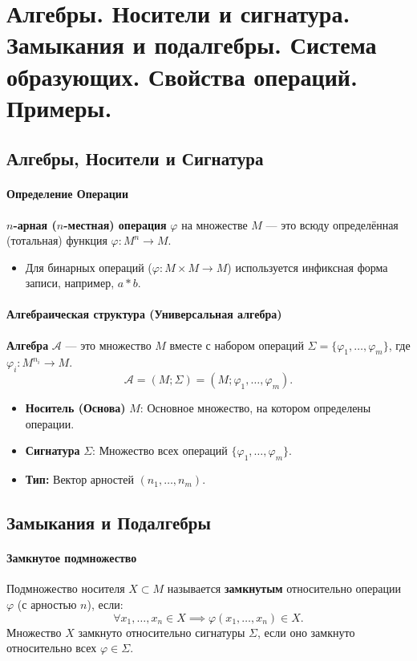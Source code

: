 \section{Алгебры. Носители и сигнатура. Замыкания и подалгебры. Система образующих. Свойства операций. Примеры.}

\subsection*{Алгебры, Носители и Сигнатура}

\paragraph{Определение Операции}
\textbf{$n$-арная ($n$-местная) операция} $\varphi$ на множестве $M$ --- это всюду определённая (тотальная) функция $\varphi: M^n \to M$.
\begin{itemize}
    \item Для бинарных операций ($\varphi: M \times M \to M$) используется инфиксная форма записи, например, $a \ast b$.
\end{itemize}

\paragraph{Алгебраическая структура (Универсальная алгебра)}
\textbf{Алгебра} $\mathcal{A}$ --- это множество $M$ вместе с набором операций $\Sigma = \{\varphi_1, \ldots, \varphi_m\}$, где $\varphi_i: M^{n_i} \to M$.
$$\mathcal{A} = (M; \Sigma) = (M; \varphi_1, \ldots, \varphi_m).$$
\begin{itemize}
    \item \textbf{Носитель (Основа)} $M$: Основное множество, на котором определены операции.
    \item \textbf{Сигнатура} $\Sigma$: Множество всех операций $\{\varphi_1, \ldots, \varphi_m\}$.
    \item \textbf{Тип:} Вектор арностей $(n_1, \ldots, n_m)$.
\end{itemize}

\subsection*{Замыкания и Подалгебры}

\paragraph{Замкнутое подмножество}
Подмножество носителя $X \subset M$ называется \textbf{замкнутым} относительно операции $\varphi$ (с арностью $n$), если:
$$\forall x_1, \ldots, x_n \in X \implies \varphi(x_1, \ldots, x_n) \in X.$$
Множество $X$ замкнуто относительно сигнатуры $\Sigma$, если оно замкнуто относительно всех $\varphi \in \Sigma$.

